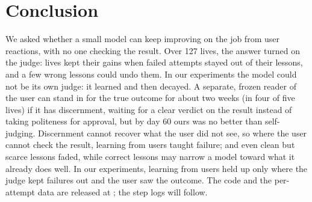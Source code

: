 \section{Conclusion}

We asked whether a small model can keep improving on the job from user reactions, with no one checking the result. Over 127 lives, the answer turned on the judge: lives kept their gains when failed attempts stayed out of their lessons, and a few wrong lessons could undo them. In our experiments the model could not be its own judge: it learned and then decayed. A separate, frozen reader of the user can stand in for the true outcome for about two weeks (in four of five lives) if it has discernment, waiting for a clear verdict on the result instead of taking politeness for approval, but by day 60 ours was no better than self-judging. Discernment cannot recover what the user did not see, so where the user cannot check the result, learning from users taught failure; and even clean but scarce lessons faded, while correct lessons may narrow a model toward what it already does well. In our experiments, learning from users held up only where the judge kept failures out and the user saw the outcome. The code and the per-attempt data are released at \repo{}; the step logs will follow.
